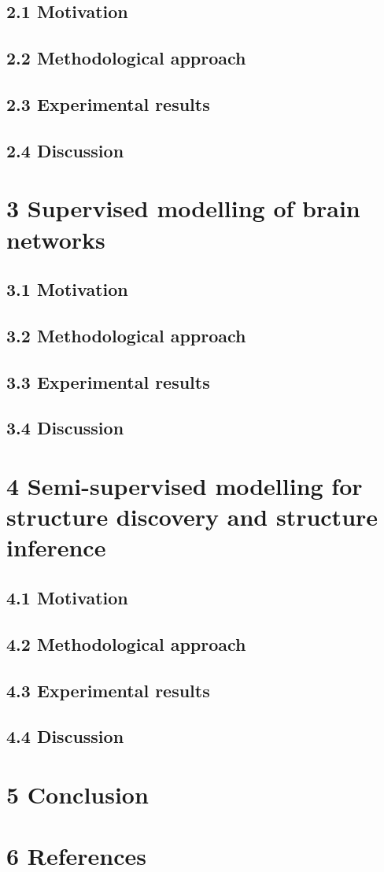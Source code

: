 \documentclass[authoryear,review,3p]{elsarticle}
\begin{document}
\subsection*{2.1 Motivation}
\subsection*{2.2 Methodological approach}
\subsection*{2.3 Experimental results}
\subsection*{2.4 Discussion}



\section*{3 Supervised modelling of brain networks}

\subsection*{3.1 Motivation}
\subsection*{3.2 Methodological approach}
\subsection*{3.3 Experimental results}
\subsection*{3.4 Discussion}


\section*{4 Semi-supervised modelling for structure discovery
and structure inference}

\subsection*{4.1 Motivation}
\subsection*{4.2 Methodological approach}
\subsection*{4.3 Experimental results}
\subsection*{4.4 Discussion}




\section*{5 Conclusion}






\bigskip
\section*{6 References}



\end{document}
